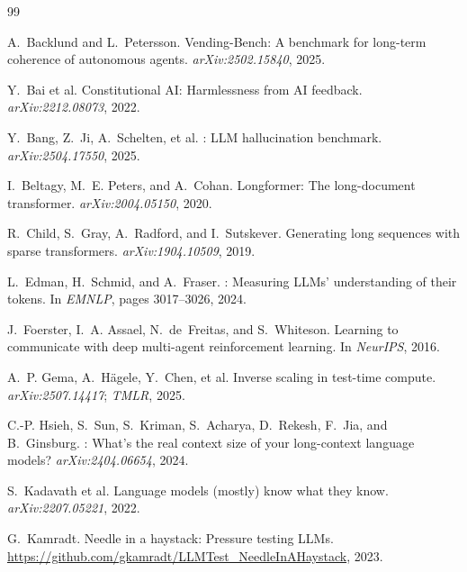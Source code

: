 \documentclass[11pt]{article}
\begin{document}
\begin{thebibliography}{99}

A.~Backlund and L.~Petersson.
\newblock Vending-Bench: A benchmark for long-term coherence of autonomous
agents.
\newblock \emph{arXiv:2502.15840}, 2025.

Y.~Bai et al.
\newblock Constitutional {AI}: Harmlessness from {AI} feedback.
\newblock \emph{arXiv:2212.08073}, 2022.

Y.~Bang, Z.~Ji, A.~Schelten, et al.
: {LLM} hallucination benchmark.
\newblock \emph{arXiv:2504.17550}, 2025.

I.~Beltagy, M.~E. Peters, and A.~Cohan.
\newblock Longformer: The long-document transformer.
\newblock \emph{arXiv:2004.05150}, 2020.

R.~Child, S.~Gray, A.~Radford, and I.~Sutskever.
\newblock Generating long sequences with sparse transformers.
\newblock \emph{arXiv:1904.10509}, 2019.

L.~Edman, H.~Schmid, and A.~Fraser.
: Measuring {LLM}s' understanding of their tokens.
\newblock In \emph{EMNLP}, pages 3017--3026, 2024.

J.~Foerster, I.~A. Assael, N.~de~Freitas, and S.~Whiteson.
\newblock Learning to communicate with deep multi-agent reinforcement learning.
\newblock In \emph{NeurIPS}, 2016.

A.~P. Gema, A.~H\"{a}gele, Y.~Chen, et al.
\newblock Inverse scaling in test-time compute.
\newblock \emph{arXiv:2507.14417}; \emph{TMLR}, 2025.

C.-P. Hsieh, S.~Sun, S.~Kriman, S.~Acharya, D.~Rekesh, F.~Jia, and B.~Ginsburg.
: What's the real context size of your long-context language
models?
\newblock \emph{arXiv:2404.06654}, 2024.

S.~Kadavath et al.
\newblock Language models (mostly) know what they know.
\newblock \emph{arXiv:2207.05221}, 2022.

G.~Kamradt.
\newblock Needle in a haystack: Pressure testing {LLM}s.
\newblock \url{https://github.com/gkamradt/LLMTest_NeedleInAHaystack}, 2023.


\end{thebibliography}
\end{document}
